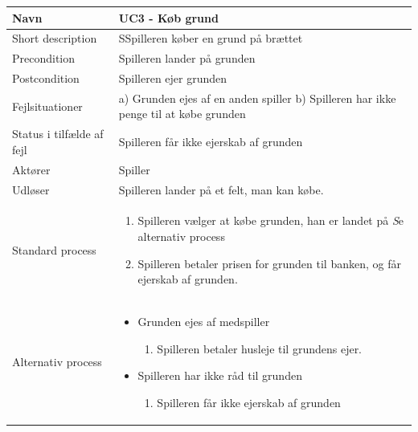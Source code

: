 \begin{center}
\begin{longtable}{|l|p{11cm}|}
\hline
Navn &  UC3 - Køb grund\\
\hline
Short description & SSpilleren køber en grund på brættet
 \\
\hline
Precondition & Spilleren lander på grunden \\
\hline
Postcondition & Spilleren ejer grunden \\
\hline
Fejlsituationer & a) Grunden ejes af en anden spiller \newline 
b) Spilleren har ikke penge til at købe grunden \\
\hline
Status i tilfælde af fejl & Spilleren får ikke ejerskab af grunden\\
\hline
Aktører & Spiller \\
\hline
Udløser & Spilleren lander på et felt, man kan købe.

 \\
\hline
Standard process &  
\begin{minipage}[t]{1\textwidth}
  \begin{enumerate}
      \item Spilleren vælger at købe grunden, han er landet på\newline
      \emph Se alternativ process\
      \item Spilleren betaler prisen for grunden til banken, \newline og får ejerskab af grunden.
     \vspace{0.5cm}
  \end{enumerate} 
  \end{minipage}
\\
\hline
Alternativ process & 
\begin{minipage}[t]{1\textwidth}
 \begin{itemize}
     \item Grunden ejes af medspiller
     \begin{enumerate}
         \item Spilleren betaler husleje til grundens ejer.
     \end{enumerate}
\item    Spilleren har ikke råd til grunden \begin{enumerate}
\item Spilleren får ikke ejerskab af grunden
\end{enumerate}
\end{itemize}


\end{minipage}

\\
\hline
\end{longtable}
\end{center}





